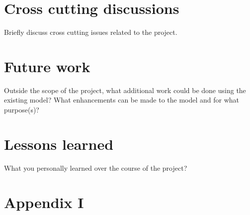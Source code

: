 \documentclass[11pt,a4paper]{article}
\begin{document}
\newpage 

\section{Cross cutting discussions} \label{cross-cutting}
Briefly discuss cross cutting issues related to the project.

\newpage

\section{Future work} \label{future-work}
Outside the scope of the project, what additional work could be done using the existing model? What enhancements can be made to the model and for what purpose(s)?

\newpage

\section{Lessons learned} \label{lessons-learned}

What you personally learned over the course of the project?


\setlength{\bibhang}{0pt}


\newpage

\section*{Appendix I} \label{appendix-i}


\end{document}
